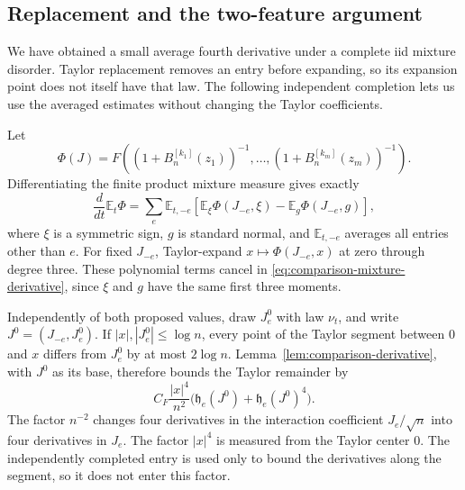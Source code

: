 \subsection{Replacement and the two-feature argument}

We have obtained a small average fourth derivative under a complete iid
mixture disorder.  Taylor replacement removes an entry before expanding,
so its expansion point does not itself have that law.  The following
independent completion lets us use the averaged estimates without changing
the Taylor coefficients.

Let
\[
 \Phi(J)=F\left((1+B_n^{[k_1]}(z_1))^{-1},\ldots,
               (1+B_n^{[k_m]}(z_m))^{-1}\right).
\]
Differentiating the finite product mixture measure gives exactly
\begin{equation}\label{eq:comparison-mixture-derivative}
 \frac d{dt}\mathbb E_t\Phi
  =\sum_e\mathbb E_{t,-e}\!\left[
       \mathbb E_{\xi}\Phi(J_{-e},\xi)
       -\mathbb E_g\Phi(J_{-e},g)\right],
\end{equation}
where $\xi$ is a symmetric sign, $g$ is standard normal, and
$\mathbb E_{t,-e}$ averages all entries other than $e$.
For fixed $J_{-e}$, Taylor-expand $x\mapsto\Phi(J_{-e},x)$ at zero through
degree three.  These polynomial terms cancel in
\eqref{eq:comparison-mixture-derivative}, since $\xi$ and $g$ have the same
first three moments.

Independently of both proposed values, draw $J_e^0$ with law $\nu_t$, and
write $J^0=(J_{-e},J_e^0)$.  If $|x|,|J_e^0|\le\log n$, every point of the
Taylor segment between $0$ and $x$ differs from $J_e^0$ by at most
$2\log n$.  Lemma~\ref{lem:comparison-derivative}, with $J^0$ as its base,
therefore bounds the Taylor remainder by
\begin{equation}\label{eq:comparison-remainder}
 C_F\frac{|x|^4}{n^2}
       \bigl(\mathfrak h_e(J^0)+\mathfrak h_e(J^0)^4\bigr).
\end{equation}
The factor $n^{-2}$ changes four derivatives in the interaction coefficient
$J_e/\sqrt n$ into four derivatives in $J_e$.  The factor $|x|^4$ is measured
from the Taylor center $0$.  The independently completed entry is used only
to bound the derivatives along the segment, so it does not enter this factor.

